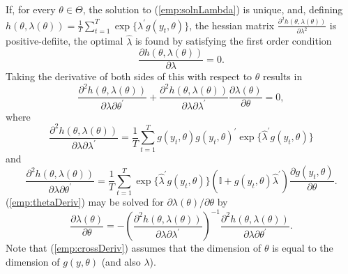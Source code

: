 \documentclass[12pt,a4paper]{article}\usepackage[]{graphicx}\usepackage[]{color}
\begin{document}
If, for every $\theta \in \Theta$, the solution to  (\ref{emp:solnLambda}) is unique, and, defining $h(\theta, \lambda(\theta)) =  \frac{1}{T} \sum_{t=1}^T \exp \{\lambda^{\prime} g(y_t, \theta) \}$, the hessian matrix $\frac{\partial^2  h(\theta, \lambda(\theta))}{\partial \lambda^2}$ is positive-defiite, the optimal $\hat{\lambda}$ is found by satisfying the first order condition
\begin{equation}
\label{emp:lambdaDeriv}
\frac{\partial h(\theta, \lambda(\theta))}{\partial \lambda} = 0.
\end{equation}
Taking the derivative of both sides of this with respect to $\theta$ results in
\begin{equation}
\label{emp:thetaDeriv}
\frac{\partial^2  h(\theta, \lambda(\theta))}{\partial \lambda \partial \theta^{\prime}} + \frac{\partial^2  h(\theta, \lambda(\theta))}{\partial \lambda \partial \lambda^{\prime}} \frac{\partial \lambda(\theta)}{\partial \theta} = 0,
\end{equation}
where
\begin{equation}
\label{emp:hessian}
\frac{\partial^2  h(\theta, \lambda(\theta))}{\partial \lambda \partial \lambda^{\prime}} = \frac{1}{T} \sum_{t=1}^T g(y_t, \theta) g(y_t, \theta)^{\prime} \exp\{\hat{\lambda}^{\prime} g(y_t, \theta) \}
\end{equation}
and
\begin{equation}
\label{emp:crossDeriv}
\frac{\partial^ 2  h(\theta, \lambda(\theta))}{\partial \lambda \partial \theta^{\prime}} = \frac{1}{T} \sum_{t=1}^T \exp\{\hat{\lambda}^{\prime} g(y_t, \theta) \} \left( \mathbb{I} + g(y_t, \theta) \hat{\lambda}^{\prime} \right) \frac{\partial g(y_t, \theta)}{\partial \theta}.
\end{equation}
(\ref{emp:thetaDeriv}) may be solved for $\partial \lambda(\theta) / \partial \theta$ by
\begin{equation}
\label{emp:thetaDerivSoln}
 \frac{\partial \lambda(\theta)}{\partial \theta} = -\left(\frac{\partial^2  h(\theta, \lambda(\theta))}{\partial \lambda \partial \lambda^{\prime}}\right)^{-1}\frac{\partial^2  h(\theta, \lambda(\theta))}{\partial \lambda \partial \theta^{\prime}}.
\end{equation}
Note that (\ref{emp:crossDeriv}) assumes that the dimension of $\theta$ is equal to the dimension of $g(y, \theta)$ (and also $\lambda$).
\\
\end{document}
